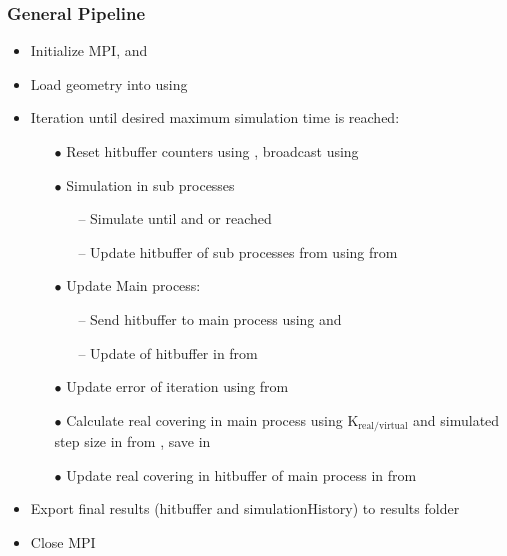 \subsubsection{General Pipeline}
\begin{itemize}[noitemsep,topsep=0pt]
\item Initialize MPI,  and 
\item Load geometry into  using 
\item Iteration until desired maximum simulation time is reached: \smallskip
	\begin{itemize}[noitemsep,topsep=0pt]
	\item[$\bullet$] Reset hitbuffer counters using , broadcast using 
	\item[$\bullet$] Simulation in sub processes
	\begin{itemize}[noitemsep,topsep=0pt]
	\item[--] Simulate until  and  or  reached
	\item[--] Update hitbuffer of sub processes from  using  from 
	\end{itemize}
	\item[$\bullet$] Update Main process:
		\begin{itemize}[noitemsep,topsep=0pt]
		\item[--] Send hitbuffer to main process using  and 
		\item[--] Update of hitbuffer in  from 
		\end{itemize}
	\item[$\bullet$] Update error of iteration using  from 
	\item[$\bullet$] Calculate real covering in main process using $\text{K}_{\text{real}/\text{virtual}}$ and simulated step size in  from , save in 
	\item[$\bullet$] Update real covering in hitbuffer of main process in  from 
	\end{itemize}\smallskip
\item Export final results (hitbuffer and simulationHistory) to results folder
\item Close MPI
\end{itemize}
\newpage






